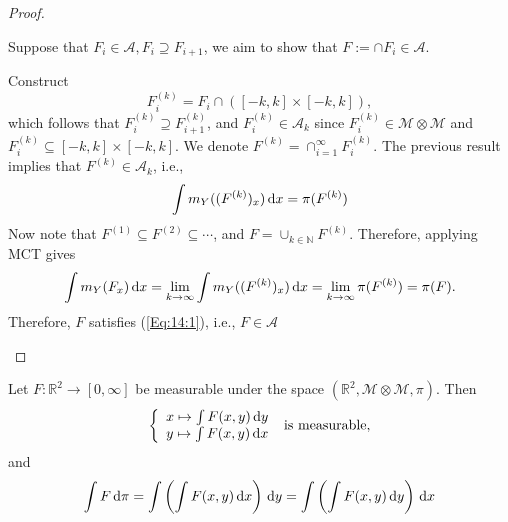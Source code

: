 \begin{proof}
\begin{itemize}
Suppose that $F_i\in\mathcal{A}, F_i\supseteq F_{i+1}$, we aim to show that $F:=\cap F_i\in\mathcal{A}$.

Construct 
\[
F_i^{(k)} = F_i\cap ([-k,k]\times[-k,k]),
\] 
which follows that $F_i^{(k)}\supseteq F_{i+1}^{(k)}$, and $F_i^{(k)}\in\mathcal{A}_k$ since 
$F_i^{(k)}\in\mathcal{M}\otimes\mathcal{M}$ and $F_i^{(k)}\subseteq[-k,k]\times[-k,k]$.
We denote $F^{(k)}=\cap_{i=1}^\infty F_i^{(k)}$.
The previous result implies that $F^{(k)}\in\mathcal{A}_k$, i.e.,
\[
\int m_Y((F^{(k)})_x)\,\mathrm{d} x =\pi(F^{(k)})
\]
Now note that $F^{(1)}\subseteq F^{(2)}\subseteq\cdots$, and $F=\cup_{k\in\mathbb{N}}F^{(k)}$.
Therefore, applying MCT gives
\[
\int m_Y(F_x)\,\mathrm{d} x = \lim_{k\to\infty}\int m_Y((F^{(k)})_x)\,\mathrm{d} x = \lim_{k\to\infty}\pi(F^{(k)}) = \pi(F).
\]
Therefore, $F$ satisfies (\ref{Eq:14:1}), i.e., $F\in\mathcal{A}$


\end{itemize}
\end{proof}

\begin{theorem}
Let $F:\mathbb{R}^2\to[0,\infty]$ be measurable under the space $(\mathbb{R}^2,\mathcal{M}\otimes\mathcal{M},\pi)$.
Then
\[
\left\{
\begin{array}{l}
x\mapsto \int F(x,y)\,\mathrm{d} y\\
y\mapsto \int F(x,y)\,\mathrm{d} x
\end{array}
\right.\text{ is measurable},
\]
and 
\[
\int F\,\mathrm{d}\pi = \int\left(\int F(x,y)\,\mathrm{d} x\right)\,\mathrm{d} y = \int\left(\int F(x,y)\,\mathrm{d} y\right)\,\mathrm{d} x
\]
\end{theorem}

